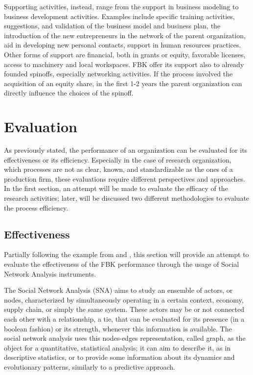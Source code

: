 Supporting activities, instead, range from the support in business modeling to business development activities. Examples include specific training activities, suggestions, and validation of the business model and business plan, the introduction of the new entrepreneurs in the network of the parent organization, aid in developing new personal contacts, support in human resources practices. Other forms of support are financial, both in grants or equity, favorable licenses, access to machinery and local workspaces. FBK offer its support also to already founded spinoffs, especially networking activities. If the process involved the acquisition of an equity share, in the first 1-2 years the parent organization can directly influence the choices of the spinoff.



\section{Evaluation}

As previously stated, the performance of an organization can be evaluated for its effectiveness or its efficiency. Especially in the case of research organization, which processes are not as clear, known, and standardizable as the ones of a production firm, these evaluations require different perspectives and approaches. In the first section, an attempt will be made to evaluate the efficacy of the research activities; later, will be discussed two different methodologies to evaluate the process efficiency. 

\subsection{Effectiveness}

Partially following the example from \citet{Giuliani2005} and \citet{Cantner2006}, this section will provide an attempt to evaluate the effectiveness of the FBK performance through the usage of Social Network Analysis instruments. 

The Social Network Analysis (SNA) aims to study an ensemble of actors, or nodes, characterized by simultaneously operating in a certain context, economy, supply chain, or simply the same system. These actors may be or not connected each other with a relationship, a tie, that can be evaluated for its presence (in a boolean fashion) or its strength, whenever this information is available. The social network analysis uses this nodes-edges representation, called graph, as the object for a quantitative, statistical analysis; it can aim to describe it, as in descriptive statistics, or to provide some information about its dynamics and evolutionary patterns, similarly to a predictive approach.

